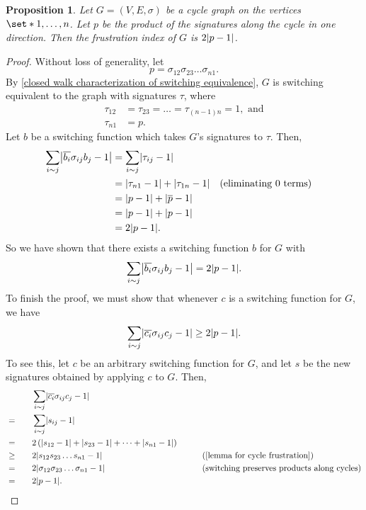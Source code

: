 \documentclass[12pt]{article}
\newtheorem{prop}[thm]{Proposition}
\theoremstyle{definition}
\DeclarePairedDelimiter\abs{\lvert}{\rvert}
\begin{document}
\begin{prop}
Let $G = (V, E, \sigma)$ be a cycle graph on the vertices $\set*{1, \dots, n}$. Let $p$ be the product of the signatures along the cycle in one direction. Then the frustration index of $G$ is $2 \abs*{p - 1}$.
\end{prop}
\begin{proof}
Without loss of generality, let 
$$p=\sigma_{12}\sigma_{23} \dots \sigma_{n1}.$$
By \cref{closed walk characterization of switching equivalence}, $G$ is switching equivalent to the graph with signatures $\tau$, where 
\begin{align*}
\tau_{12} &= \tau_{23} = \dots = \tau_{(n-1)n} = 1, \text{ and} \\
\tau_{n1} &= p.
\end{align*}
Let $b$ be a switching function which takes $G$'s signatures to $\tau$. Then,
\begin{align*}
\sum_{i \sim j} \abs*{\overline{b_i} \sigma_{ij} b_j - 1} 
&= \sum_{i \sim j} \abs*{\tau_{ij} - 1} \\
&= \abs*{\tau_{n1} - 1} + \abs*{\tau_{1n} - 1} && \text{(eliminating 0 terms)} \\
&= \abs*{p - 1} + \abs*{\overline{p} - 1} \\
&= \abs*{p - 1} + \abs*{p - 1} \\
&= 2 \abs*{p - 1}.
\end{align*}
So we have shown that there exists a switching function $b$ for $G$ with 
$$
\sum_{i \sim j} \abs*{\overline{b_i} \sigma_{ij} b_j - 1} = 2 \abs*{p - 1}.
$$ 
To finish the proof, we must show that whenever $c$ is a switching function for $G$, we have
$$
\sum_{i \sim j} \abs*{\overline{c_i} \sigma_{ij} c_j - 1} \geq 2 \abs*{p - 1}.
$$
To see this, let $c$ be an arbitrary switching function for $G$, and let $s$ be the new signatures obtained by applying $c$ to $G$. Then,
\begin{alignat*}{3}
&& &\sum_{i \sim j} \abs*{\overline{c_i} \sigma_{ij} c_j - 1} && \\
&= & \quad &\sum_{i \sim j} \abs*{s_{ij} - 1} && \\
&= & &2 \left( \abs*{s_{12} - 1} + \abs*{s_{23} - 1} + \dots + \abs*{s_{n1} - 1} \right) && \\
&\geq & &2 \abs*{s_{12} s_{23} \dots s_{n1} - 1} & &\text{(\cref{lemma for cycle frustration})} \\
&= & &2 \abs*{\sigma_{12} \sigma_{23} \dots \sigma_{n1} - 1} &\quad\quad &\text{(switching preserves products along cycles)} \\
&= & &2 \abs*{p-1}. &&
\end{alignat*}
\end{proof}
\end{document}
